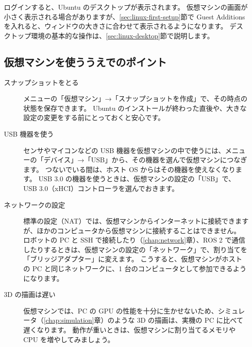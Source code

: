 ログインすると、Ubuntu のデスクトップが表示されます。
仮想マシンの画面が小さく表示される場合がありますが、\ref{sec:linux-first-setup}節で Guest Additions を入れると、ウィンドウの大きさに合わせて表示されるようになります。
デスクトップ環境の基本的な操作は、\ref{sec:linux-desktop}節で説明します。

\subsection{仮想マシンを使ううえでのポイント}

\begin{description}
  \item[スナップショットをとる]
    メニューの「仮想マシン」→「スナップショットを作成」で、その時点の状態を保存できます。
    Ubuntu のインストールが終わった直後や、大きな設定の変更をする前にとっておくと安心です。
  \item[USB 機器を使う]
    センサやマイコンなどの USB 機器を仮想マシンの中で使うには、メニューの「デバイス」→「USB」から、その機器を選んで仮想マシンにつなぎます。
    つないでいる間は、ホスト OS からはその機器を使えなくなります。
    USB 3.0 の機器を使うときは、仮想マシンの設定の「USB」で、USB 3.0（xHCI）コントローラを選んでおきます。
  \item[ネットワークの設定]
    標準の設定（NAT）では、仮想マシンからインターネットに接続できますが、ほかのコンピュータから仮想マシンに接続することはできません。
    ロボットの PC と SSH で接続したり（\ref{chap:network}章）、ROS 2 で通信したりするときは、仮想マシンの設定の「ネットワーク」で、割り当てを「ブリッジアダプター」に変えます。
    こうすると、仮想マシンがホストの PC と同じネットワークに、1 台のコンピュータとして参加できるようになります。
  \item[3D の描画は遅い]
    仮想マシンでは、PC の GPU の性能を十分に生かせないため、シミュレータ（\ref{chap:simulation}章）のような 3D の描画は、実機の PC に比べて遅くなります。
    動作が重いときは、仮想マシンに割り当てるメモリや CPU を増やしてみましょう。
\end{description}

